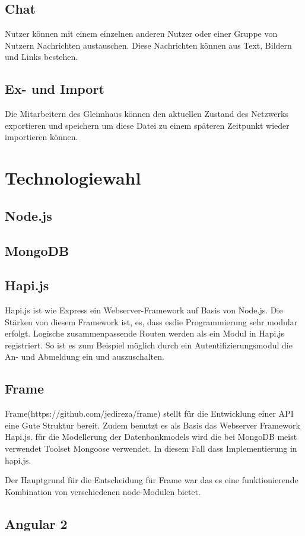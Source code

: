 \documentclass[12pt]{article} %
\begin{document}
\subsection{Chat}
Nutzer können mit einem einzelnen anderen Nutzer oder einer Gruppe von Nutzern Nachrichten austauschen. Diese Nachrichten können aus Text, Bildern und Links bestehen.

\subsection{Ex- und Import}
Die Mitarbeitern des Gleimhaus können den aktuellen Zustand des Netzwerks exportieren und speichern um diese Datei zu einem späteren Zeitpunkt wieder importieren können.

\section{Technologiewahl}
\subsection{Node.js}
\subsection{MongoDB}
\subsection{Hapi.js}
Hapi.js ist wie Express ein Webserver-Framework auf Basis von Node.js. Die Stärken von diesem Framework ist, es, dass esdie Programmierung sehr modular erfolgt. Logische zusammenpassende Routen werden als ein Modul in Hapi.js registriert. So ist es zum Beispiel möglich durch ein Autentifizierungsmodul die An- und Abmeldung ein und auszuschalten.
\subsection{Frame}
Frame(https://github.com/jedireza/frame) stellt für die Entwicklung einer API eine Gute Struktur bereit. Zudem benutzt es als Basis das Webserver Framework Hapi.js. für die Modellerung der Datenbankmodels wird die bei MongoDB meist verwendet Toolset Mongoose verwendet. In diesem Fall dass Implementierung in hapi.js.

Der Hauptgrund für die Entscheidung für Frame war das es eine funktionierende Kombination von verschiedenen node-Modulen bietet.
\subsection{Angular 2}
\end{document}
